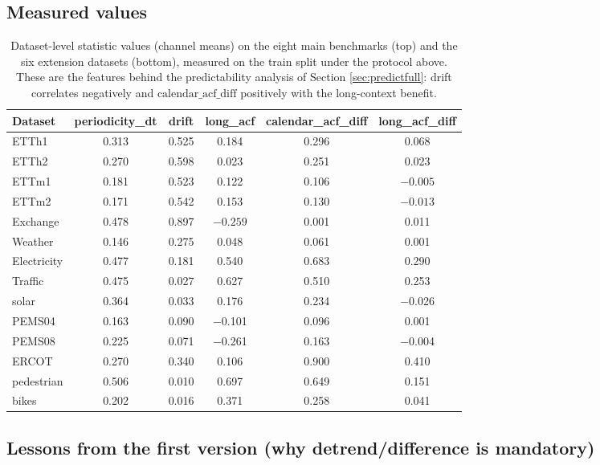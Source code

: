 \subsection{Measured values}

\begin{table}[t]
\caption{Dataset-level statistic values (channel means) on the eight main benchmarks (top) and the six extension datasets (bottom), measured on the train split under the protocol above. These are the features behind the predictability analysis of Section \ref{sec:predictfull}: drift correlates negatively and $\mathrm{calendar\_acf\_diff}$ positively with the long-context benefit.}
\label{tab:stats_values}
\centering\small
\begin{tabular}{lccccc}
\toprule
Dataset & periodicity\_dt & drift & long\_acf & calendar\_acf\_diff & long\_acf\_diff \\
\midrule
ETTh1 & 0.313 & 0.525 & 0.184 & 0.296 & 0.068 \\
ETTh2 & 0.270 & 0.598 & 0.023 & 0.251 & 0.023 \\
ETTm1 & 0.181 & 0.523 & 0.122 & 0.106 & $-0.005$ \\
ETTm2 & 0.171 & 0.542 & 0.153 & 0.130 & $-0.013$ \\
Exchange & 0.478 & 0.897 & $-0.259$ & 0.001 & 0.011 \\
Weather & 0.146 & 0.275 & 0.048 & 0.061 & 0.001 \\
Electricity & 0.477 & 0.181 & 0.540 & 0.683 & 0.290 \\
Traffic & 0.475 & 0.027 & 0.627 & 0.510 & 0.253 \\
\midrule
solar & 0.364 & 0.033 & 0.176 & 0.234 & $-$0.026 \\
PEMS04 & 0.163 & 0.090 & $-$0.101 & 0.096 & 0.001 \\
PEMS08 & 0.225 & 0.071 & $-$0.261 & 0.163 & $-$0.004 \\
ERCOT & 0.270 & 0.340 & 0.106 & 0.900 & 0.410 \\
pedestrian & 0.506 & 0.010 & 0.697 & 0.649 & 0.151 \\
bikes & 0.202 & 0.016 & 0.371 & 0.258 & 0.041 \\
\bottomrule
\end{tabular}
\end{table}

\subsection{Lessons from the first version (why detrend/difference is mandatory)}

